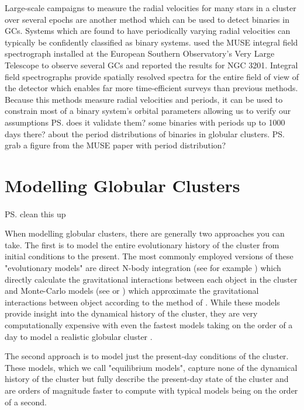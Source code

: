 Large-scale campaigns to measure the radial velocities for many stars in a cluster over several
epochs are another method which can be used to detect binaries in GCs. Systems which are found to
have periodically varying radial velocities can typically be confidently classified as binary
systems. \citet{Giesers2019} used the MUSE integral field spectrograph installed at the European
Southern Observatory's Very Large Telescope to observe several GCs and reported the results for NGC
3201. Integral field spectrographs provide spatially resolved spectra for the entire field of view
of the detector which enables far more time-efficient surveys than previous methods. Because this
methods measure radial velocities and periods, it can be used to constrain most of a binary system's
orbital parameters allowing us to verify our assumptions \ps{does it validate them? some binaries
	with periods up to 1000 days there?} about the period distributions of binaries in globular
clusters. \ps{grab a figure from the MUSE paper with period distribution?}



\section{Modelling Globular Clusters}

\paragraph{}

\ps{clean this up}

When modelling globular clusters, there are generally two approaches you can take. The first is to
model the entire evolutionary history of the cluster from initial conditions to the present. The
most commonly employed versions of these "evolutionary models" are direct N-body integration (see
for example \citet{Baumgardt2017a}) which directly calculate the gravitational interactions between
each object in the cluster and Monte-Carlo models (see \citet{Rodriguez2021} or \cite{Hypki2013})
which approximate the gravitational interactions between object according to the method of
\citet{Henon1971}. While these models provide insight into the dynamical history of the cluster,
they are very computationally expensive with even the fastest models taking on the order of a day
to model a realistic globular cluster \citep{Rodriguez2021}.

The second approach is to model just the present-day conditions of the cluster. These models, which
we call "equilibrium models", capture none of the dynamical history of the cluster but fully
describe the present-day state of the cluster and are orders of magnitude faster to compute with
typical models being on the order of a second.

